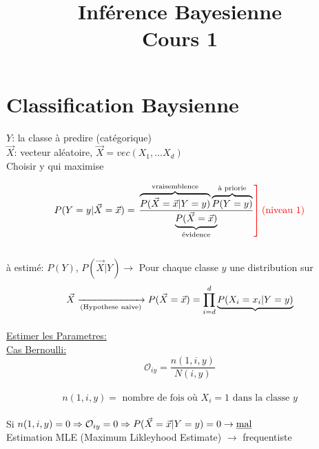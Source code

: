 \documentclass{article}
\newlength\tindent
\renewcommand{\indent}{\hspace*{\tindent}}
\newcommand{\tikzmark}[1]{\tikz[baseline,remember picture] \coordinate (#1) {};}
\begin{document}
\title{Inférence Bayesienne \\ Cours 1}
\author{} 
\date{}

\maketitle

\section{Classification Baysienne}

$Y$: la classe à predire (catégorique)\\
$\vec{X}$: vecteur aléatoire, $\vec{X} = vec(X_1, ... X_d)$ \\

Choisir y qui maximise 

$$P(Y=y|\vec{X}=\vec{x}) = \left. \frac{\overbrace{P(\vec{X}=\vec{x}|Y=y)}^\text{vraisemblence} \overbrace{P(Y=y)}^\text{à priorie}}{\underbrace{P(\vec{X}=\vec{x})}_\text{évidence}} \color{red}\right] \color{red}\text{(niveau 1)} $$ \\

à estimé: $P(Y)$, $P(\vec{X}|Y) \rightarrow$ Pour chaque classe $y$ une distribution sur 
\begin{equation*}
 \vec{X} \xrightarrow[\text{(Hypothese naïve)}]{} P(\vec{X}=\vec{x}) = \prod^d_{i=d} \underbrace{P(X_i=x_i|Y=y)}_{\tikzmark{P}}
\end{equation*}
\vspace{1em}

\underline{Estimer les Parametres:}\\
\indent \underline{Cas Bernoulli:}
$$\mathcal{O}_{iy}=\frac{n(1,i,y)}{N(i,y)}$$\\
$$n(1,i,y) = \text{ nombre de fois où } X_i=1 \text{ dans la classe } y$$\\
Si $n(1,i,y) = 0 \Rightarrow \mathcal{O}_{iy}=0 \Rightarrow P(\vec{X}=\vec{x}|Y=y) = 0 \rightarrow \text{\underline{mal}}$ \\
Estimation MLE (Maximum Likleyhood Estimate) $\rightarrow$ frequentiste
\end{document}
